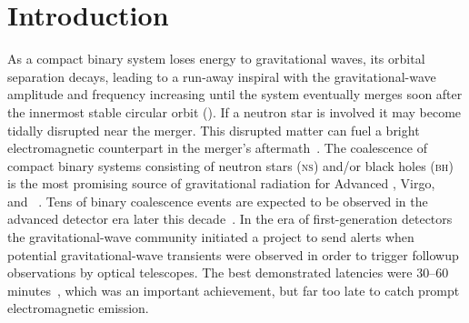 \section{Introduction}
\label{sec:introduction}


As a compact binary system loses energy to gravitational waves, its orbital
separation decays, leading to a run-away inspiral with the
gravitational-wave amplitude and frequency increasing until the system
eventually merges soon after the innermost stable circular orbit (\ISCO). If a
neutron star is involved it may become tidally disrupted near the merger.  This
disrupted matter can fuel a bright electromagnetic counterpart in the merger's aftermath~\cite{shibata:2007}.
The coalescence of compact binary systems consisting of neutron stars
(\textsc{ns}) and/or black holes (\textsc{bh}) is the most promising source of
gravitational radiation for Advanced \LIGO, Virgo, \GEO\, and
\LCGT~\cite{ALIGOWeb, AVirgoWeb, GEOWeb, LCGTWeb}.  Tens of binary coalescence
events are expected to be observed in the advanced detector era later this
decade~\cite{Abadie:2010p10836}. In the era of first-generation
detectors the gravitational-wave community
initiated a project to send alerts when potential gravitational-wave transients
were observed in order to trigger followup observations by optical telescopes.
The best demonstrated latencies were 30--60 minutes~\cite{HugheyGWPAW2011}, which was
an important achievement, but far too late to catch prompt electromagnetic emission.

